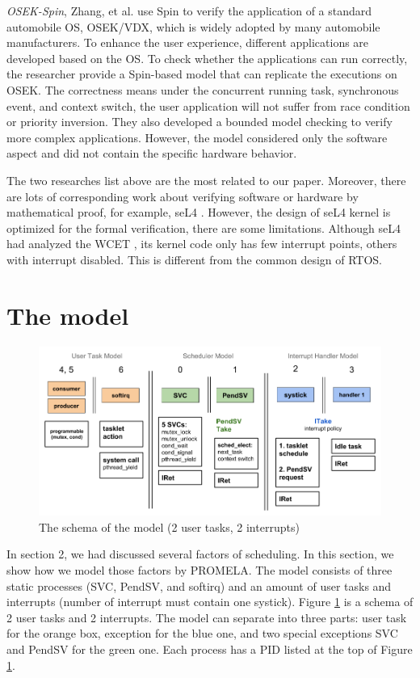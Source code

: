 \textit{OSEK-Spin}, Zhang, et al. \cite{10.1007/978-3-319-17581-2_16} use Spin to verify the application of a standard automobile OS, OSEK/VDX, which is widely adopted by many automobile manufacturers. To enhance the user experience, different applications are developed based on the OS. To check whether the applications can run correctly, the researcher provide a Spin-based model that can replicate the executions on OSEK. The correctness means under the concurrent running task, synchronous event, and context switch, the user application will not suffer from race condition or priority inversion. They also developed a bounded model checking to verify more complex applications. However, the model considered only the software aspect and did not contain the specific hardware behavior.

The two researches list above are the most related to our paper. Moreover, there are lots of corresponding work about verifying software or hardware by mathematical proof, for example, seL4 \cite{Klein:2009:SFV:1629575.1629596}. However, the design of seL4 kernel is optimized for the formal verification, there are some limitations. Although seL4 had analyzed the WCET \cite{6121451}, its kernel code only has few interrupt points, others with interrupt disabled. This is different from the common design of RTOS.

\section{The model}

\begin{figure}
\includegraphics[width=0.7\linewidth]{img/model}
\caption{The schema of the model (2 user tasks, 2 interrupts)}
\label{fig:model}
\end{figure}

In section 2, we had discussed several factors of scheduling. In this section, we show how we model those factors by PROMELA. The model consists of three static processes (SVC, PendSV, and softirq) and an amount of user tasks and interrupts (number of interrupt must contain one systick). Figure \ref{fig:model} is a schema of 2 user tasks and 2 interrupts. The model can separate into three parts: user task for the orange box, exception for the blue one, and two special exceptions SVC and PendSV for the green one. Each process has a PID listed at the top of Figure \ref{fig:model}.


